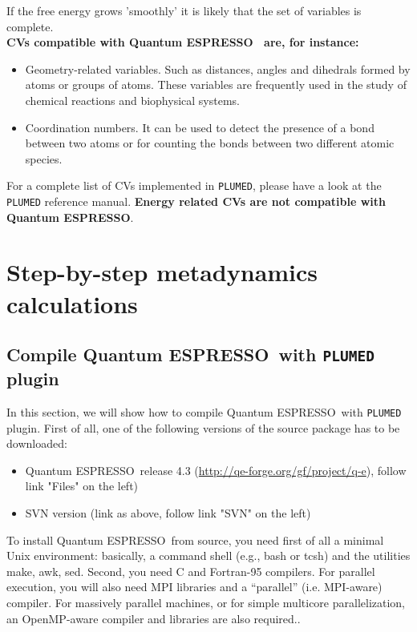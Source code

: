 \documentclass[12pt,a4paper]{article}
\def\qe{{\sc Quantum ESPRESSO}}
\begin{document}
If the free energy grows 'smoothly' it is likely that the set of variables is complete. \\

{\bf CVs compatible with \qe~ are, for instance:}

\begin{itemize}
\item Geometry-related variables. Such as distances, angles and dihedrals formed by atoms or groups of atoms. These variables are frequently used in the study of chemical reactions and biophysical systems.
\item Coordination numbers. It can be used to detect the presence of a bond between two atoms or for counting the bonds between two different atomic species.
\end{itemize}

For a complete list of CVs implemented in \texttt{PLUMED}, please have a look at the \texttt{PLUMED} reference manual.
{\bf Energy related CVs are not compatible with \qe}.


\section{Step-by-step metadynamics calculations}

\subsection{Compile \qe\ with \texttt{PLUMED} plugin}

In this section, we will show how to compile \qe\ with \texttt{PLUMED} plugin.
First of all, one of the following versions of the source package has to be 
downloaded:

\begin{itemize}
\item \qe\ release 4.3
(\href{http://qe-forge.org/gf/project/q-e}{http://qe-forge.org/gf/project/q-e}),
 follow link "Files" on the left)
\item SVN version (link as above, follow link "SVN" on the left)
\end{itemize}

To install \qe\ from source, you need first of all a minimal Unix environment: basically, a command shell (e.g., bash or tcsh) and the utilities make, awk, sed. Second, you need C and Fortran-95 compilers. For parallel execution, you will also need MPI libraries and a ``parallel'' (i.e. MPI-aware) compiler. For massively parallel machines, or for simple multicore parallelization, an OpenMP-aware compiler and libraries are also required.\cite{QE:guide}.
\end{document}
